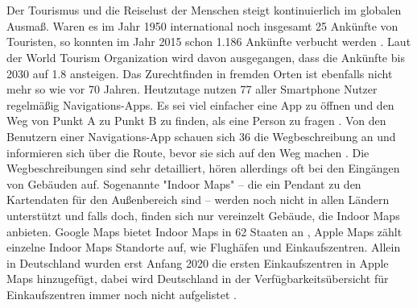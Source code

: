 \chapter{
}

\section{
}
Der Tourismus und die Reiselust der Menschen steigt kontinuierlich im globalen Ausmaß. Waren es im Jahr 1950 international noch insgesamt \SI{25}{\mio} Ankünfte von Touristen, so konnten im Jahr 2015 schon \SI{1.186}{\mrd} Ankünfte verbucht werden \parencite{GLA2017}. Laut der World Tourism Organization wird davon ausgegangen, dass die Ankünfte bis 2030 auf \SI{1.8}{\mrd} ansteigen. Das Zurechtfinden in fremden Orten ist ebenfalls nicht mehr so wie vor 70 Jahren. Heutzutage nutzen \SI{77}{\prc} aller Smartphone Nutzer regelmäßig Navigations-Apps. Es sei viel einfacher eine App zu öffnen und den Weg von Punkt A zu Punkt B zu finden, als eine Person zu fragen \parencite{PAN2018}.%
%
Von den Benutzern einer Navigations-App schauen sich \SI{36}{\prc} die Wegbeschreibung an und informieren sich über die Route, bevor sie sich auf den Weg machen \parencite{PAN2018}. Die Wegbeschreibungen sind sehr detailliert, hören allerdings oft bei den Eingängen von Gebäuden auf. Sogenannte "Indoor Maps" – die ein Pendant zu den Kartendaten für den Außenbereich sind – werden noch nicht in allen Ländern unterstützt und falls doch, finden sich nur vereinzelt Gebäude, die Indoor Maps anbieten. Google Maps bietet Indoor Maps in 62 Staaten an \parencite{GOO2020}, Apple Maps zählt einzelne Indoor Maps Standorte auf, wie Flughäfen und Einkaufszentren. Allein in Deutschland wurden erst Anfang 2020 die ersten Einkaufszentren in Apple Maps hinzugefügt, dabei wird Deutschland in der Verfügbarkeitsübersicht für Einkaufszentren immer noch nicht aufgelistet \parencite{OES2020}.%
%
\section{
}

